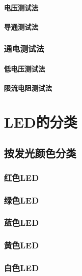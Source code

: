 \documentclass[12pt,UTF8]{ctexbook}
\begin{document}
\subsubsection{电压测试法}

\subsubsection{导通测试法}

\subsection{通电测试法}

\subsubsection{低电压测试法}

\subsubsection{限流电阻测试法}

\chapter{LED的分类}

\section{按发光颜色分类}

\subsection{红色LED}

\subsection{绿色LED}

\subsection{蓝色LED}

\subsection{黄色LED}

\subsection{白色LED}
\end{document}
